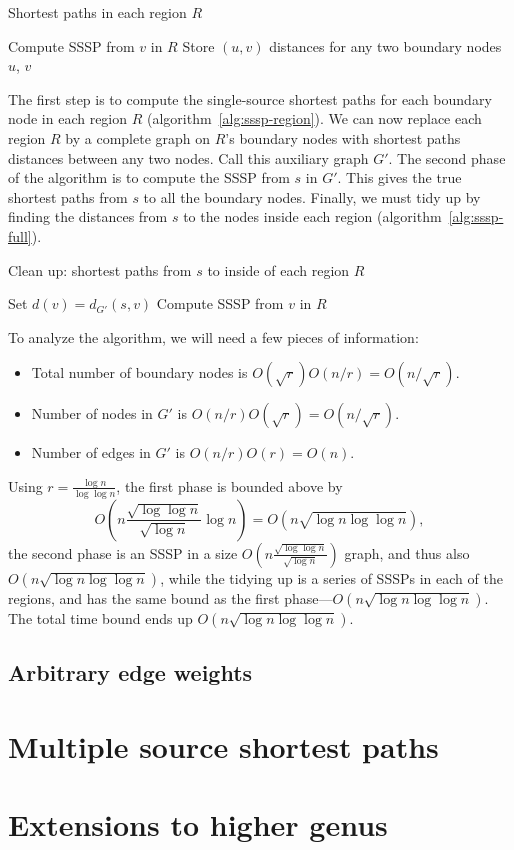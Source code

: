 \documentclass[12pt]{article}
\begin{document}
\begin{algorithm}[!htb]
  \caption{Shortest paths in each region $R$}
  \label{alg:sssp-region}
  \begin{algorithmic}
        \State Compute SSSP from $v$ in $R$
        \State Store $(u,v)$ distances for any two boundary nodes $u$, $v$
      \EndFor
    \EndFor
  \end{algorithmic}
\end{algorithm}

The first step is to compute the single-source shortest paths for each boundary node in each region $R$ (algorithm~\ref{alg:sssp-region}). We can now replace each region $R$ by a complete graph on $R$'s boundary nodes with shortest paths distances between any two nodes. Call this auxiliary graph $G'$. The second phase of the algorithm is to compute the SSSP from $s$ in $G'$. This gives the true shortest paths from $s$ to all the boundary nodes. Finally, we must tidy up by finding the distances from $s$ to the nodes inside each region (algorithm~\ref{alg:sssp-full}).

\begin{algorithm}[!htb]
  \caption{Clean up: shortest paths from $s$ to inside of each region $R$}
  \label{alg:sssp-full}
  \begin{algorithmic}
        \State Set $d(v) = d_{G'}(s,v)$
        \State Compute SSSP from $v$ in $R$
      \EndFor
    \EndFor
  \end{algorithmic}
\end{algorithm}

To analyze the algorithm, we will need a few pieces of information:
\begin{itemize}
\item Total number of boundary nodes is $O(\sqrt{r})O(n/r) = O(n/\sqrt{r})$.
\item Number of nodes in $G'$ is $O(n/r)O(\sqrt{r})=O(n/\sqrt{r})$.
\item Number of edges in $G'$ is $O(n/r)O(r) = O(n)$.
\end{itemize}

Using $r=\frac{\log n}{\log \log n}$, the first phase is bounded above by
\[
  O(n\frac{\sqrt{\log \log n}}{\sqrt{\log n}} \log n) = O(n \sqrt{\log n \log \log n}),
\]
the second phase is an SSSP in a size $O(n \frac{\sqrt{\log \log n}}{\sqrt{\log n}})$ graph, and thus also $O(n \sqrt{\log n \log \log n})$, while the tidying up is a series of SSSPs in each of the regions, and has the same bound as the first phase---$O(n \sqrt{\log n \log \log n})$. The total time bound ends up $O(n \sqrt{\log n \log \log n})$.

\subsection{Arbitrary edge weights}
\label{sec:arbitr-edge-weights}

\section{Multiple source shortest paths}
\label{sec:mult-source-short}

\section{Extensions to higher genus}
\label{sec:extens-high-genus}




\end{document}

